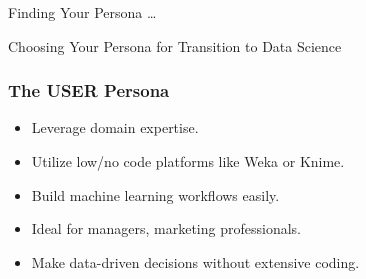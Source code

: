 
\begin{frame}[fragile]\frametitle{}
	
	\begin{center}
	{\Large Finding Your Persona \ldots

	Choosing Your Persona for Transition to Data Science}  
	\end{center}

\end{frame}



\begin{frame}[fragile]\frametitle{The USER Persona}
        \begin{itemize}
            \item Leverage domain expertise.
            \item Utilize low/no code platforms like Weka or Knime.
            \item Build machine learning workflows easily.
            \item Ideal for managers, marketing professionals.
            \item Make data-driven decisions without extensive coding.
        \end{itemize}
\end{frame}

